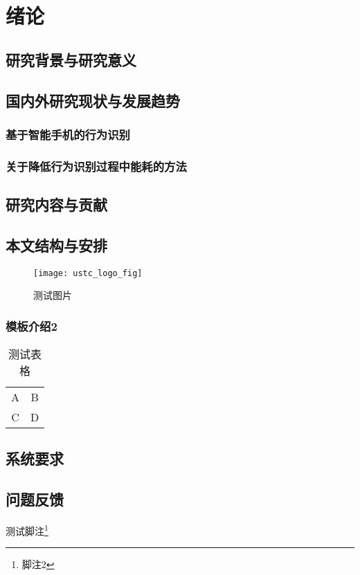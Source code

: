 \chapter{绪论}



\section{研究背景与研究意义}
\section{国内外研究现状与发展趋势}
\subsection{基于智能手机的行为识别}
\subsection{关于降低行为识别过程中能耗的方法}
\section{研究内容与贡献}
\section{本文结构与安排}

\begin{figure}[ht]
\centering
\texttt{[image: ustc\_logo\_fig]}
\caption{测试图片}
\end{figure}


\subsection{模板介绍2}

\begin{table}[ht]
\centering
\caption{测试表格}
\begin{tabular}{cc}
A   &   B   \\
C   &   D   \\
\end{tabular}
\end{table}



\section{系统要求}



\section{问题反馈}
测试脚注\footnote{脚注2}

